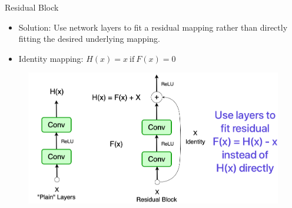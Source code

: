 \documentclass[serif, aspectratio=169]{beamer}
\begin{document}
\begin{frame}{Residual Block}
	
	\begin{itemize}
		\item Solution: Use network layers to fit a residual mapping rather than directly fitting the desired underlying mapping.
		\item Identity mapping: $H(x) = x \  \text{if} \ F(x) = 0$
	\end{itemize}
	
	\begin{figure}[htpb]
		\begin{center}
			\hspace{2cm} \includegraphics[keepaspectratio, scale=0.24]{pic/resBlock2}
		\end{center}
	\end{figure}

\end{frame}
\end{document}
